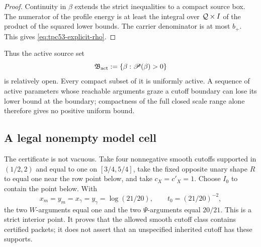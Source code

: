 \begin{proof}
Continuity in \(\beta\) extends the strict inequalities to a compact
source box.  The numerator of the profile energy is at least the
integral over \(\mathcal Q\times I\) of the product of the squared lower bounds.
The carrier denominator is at most \(b_+\).  This gives
\eqref{eq:tpc53-explicit-rho}.
\end{proof}

Thus the active source set
\begin{equation}
 \mathfrak B_{\rm act}
 :=\{\beta:\mathscr P(\beta)>0\}
 \label{eq:tpc53-active-set}
\end{equation}
is relatively open.  Every compact subset of it is uniformly active.  A sequence
of active parameters whose reachable arguments graze a cutoff boundary
can lose its lower bound at the boundary; compactness of the full closed
scale range alone therefore gives no positive uniform bound.

\subsection{A legal nonempty model cell}

The certificate is not vacuous.  Take four nonnegative smooth cutoffs
supported in \((1/2,2)\) and equal to one on \([3/4,5/4]\), take the
fixed opposite unary shape \(R\) to equal one near the row point below,
and take \(c_X=c'_X=1\).  Choose \(I_0\) to contain the point below.  With
\[
 x_m=y_m=x_\gamma=y_\gamma=\log(21/20),
 \qquad t_0=(21/20)^{-2},
\]
the two \(W\)-arguments equal one and the two \(\Psi\)-arguments equal
\(20/21\).  This is a strict interior point.  It proves that the allowed
smooth cutoff class contains certified packets; it does not assert that
an unspecified inherited cutoff has these supports.

